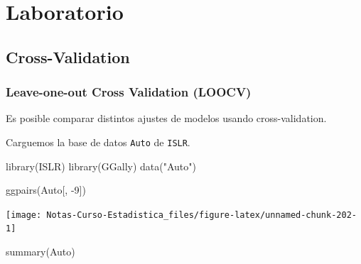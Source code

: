 \documentclass[
  12pt,
]{book}
\newenvironment{Shaded}{\begin{snugshade}}{\end{snugshade}}
\newcommand{\DecValTok}[1]{\textcolor[rgb]{0.00,0.00,0.81}{#1}}
\newcommand{\FunctionTok}[1]{\textcolor[rgb]{0.00,0.00,0.00}{#1}}
\newcommand{\NormalTok}[1]{#1}
\newcommand{\SpecialCharTok}[1]{\textcolor[rgb]{0.00,0.00,0.00}{#1}}
\newcommand{\StringTok}[1]{\textcolor[rgb]{0.31,0.60,0.02}{#1}}
\begin{document}
\hypertarget{laboratorio-6}{%
\section{Laboratorio}\label{laboratorio-6}}

\hypertarget{cross-validation}{%
\subsection{Cross-Validation}\label{cross-validation}}

\hypertarget{leave-one-out-cross-validation-loocv}{%
\subsubsection{Leave-one-out Cross Validation
(LOOCV)}\label{leave-one-out-cross-validation-loocv}}

Es posible comparar distintos ajustes de modelos usando
cross-validation.

Carguemos la base de datos \texttt{Auto} de \texttt{ISLR}.

\begin{Shaded}
\begin{Highlighting}[]
\FunctionTok{library}\NormalTok{(ISLR)}
\FunctionTok{library}\NormalTok{(GGally)}
\FunctionTok{data}\NormalTok{(}\StringTok{"Auto"}\NormalTok{)}
\end{Highlighting}
\end{Shaded}

\begin{Shaded}
\begin{Highlighting}[]
\FunctionTok{ggpairs}\NormalTok{(Auto[, }\SpecialCharTok{{-}}\DecValTok{9}\NormalTok{])}
\end{Highlighting}
\end{Shaded}

\begin{center}\texttt{[image: Notas-Curso-Estadistica\_files/figure-latex/unnamed-chunk-202-1]} \end{center}

\begin{Shaded}
\begin{Highlighting}[]
\FunctionTok{summary}\NormalTok{(Auto)}
\end{Highlighting}
\end{Shaded}
\end{document}
